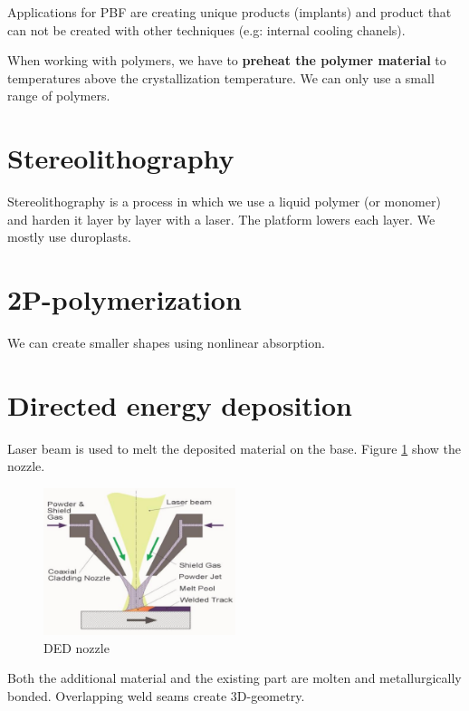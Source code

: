 Applications for PBF are creating unique products (implants) and product that can not be 
created with other techniques (e.g: internal cooling chanels).

When working with polymers, we have to \textbf{preheat the  polymer material} to temperatures above 
the crystallization temperature. We can only use a small range of polymers. 


\section{Stereolithography}

Stereolithography is a process in which we use a liquid polymer (or monomer) and 
harden it layer by layer with a laser. The platform lowers each layer. 
We mostly use duroplasts.

\section{2P-polymerization}
We can create smaller shapes using nonlinear absorption. 

\section{Directed energy deposition}
Laser beam is used to melt the deposited material on the base. Figure \ref{fig:ded} show the nozzle.

\begin{figure}[h!]
    \centering
    \includegraphics[width=0.5\textwidth]{slike/ded.png}
    \caption{DED nozzle}
    \label{fig:ded}
\end{figure}

Both the additional material and the existing part are molten and metallurgically bonded. 
Overlapping weld seams create 3D-geometry. 
